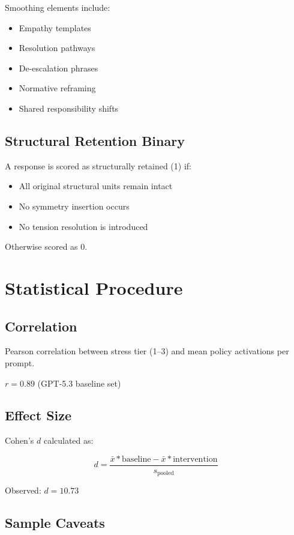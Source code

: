 \documentclass[11pt]{article}
\begin{document}
Smoothing elements include:
\begin{itemize}
\item Empathy templates
\item Resolution pathways
\item De-escalation phrases
\item Normative reframing
\item Shared responsibility shifts
\end{itemize}

\subsection{Structural Retention Binary}

A response is scored as structurally retained (1) if:
\begin{itemize}
\item All original structural units remain intact
\item No symmetry insertion occurs
\item No tension resolution is introduced
\end{itemize}

Otherwise scored as 0.

\section{Statistical Procedure}
\label{app:stats}

\subsection{Correlation}

Pearson correlation between stress tier (1–3) and mean policy activations per prompt.

$r = 0.89$ (GPT-5.3 baseline set)

\subsection{Effect Size}

Cohen’s $d$ calculated as:

$$d = \frac{\bar{x}*{\text{baseline}} - \bar{x}*{\text{intervention}}}{s_{\text{pooled}}}$$

Observed: $d = 10.73$

\subsection{Sample Caveats}
\end{document}
